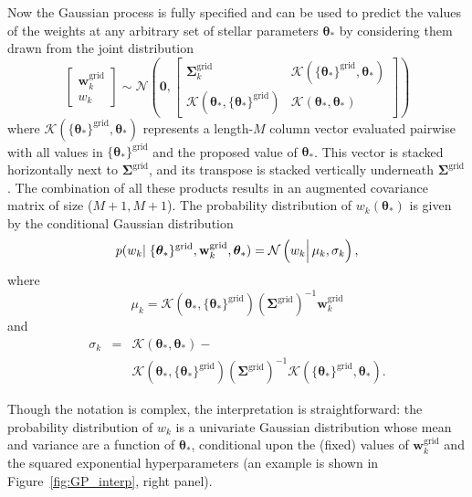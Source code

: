 \documentclass[iop,floatfix,numberedappendix,twocolappendix]{emulateapj}
\newcommand{\vt}{ {\bm \theta}}
\begin{document}
Now the Gaussian process is fully specified and can be used to predict the values of the weights at 
any arbitrary set of stellar parameters $\vt_\ast$ by considering them drawn from the joint 
distribution 
\begin{equation}
  \begin{bmatrix}
    \mathbf{w}_k^\textrm{grid}\\
    w_k
  \end{bmatrix} \sim
  \mathcal{N} \left (
  \mathbf{0},
  \begin{bmatrix}
  \mathbf{\Sigma}_k^\textrm{grid} & \mathcal{K}( \{\vt_\ast \}^\textrm{grid}, \vt_\ast) \\
  \mathcal{K}(\vt_\ast, \{\vt_\ast \}^\textrm{grid}) & \mathcal{K}(\vt_\ast,\vt_\ast)
  \end{bmatrix}
  \right )
\end{equation}
where $\mathcal{K}( \{\vt_\ast \}^\textrm{grid}, \vt_\ast)$ represents a length-$M$ column vector 
evaluated pairwise with all values in $\{\vt_\ast \}^\textrm{grid}$ and the proposed value of 
$\vt_\ast$.  This vector is stacked horizontally next to $\mathbf{\Sigma}^\textrm{grid}$, and its 
transpose is stacked vertically underneath $\mathbf{\Sigma}^\textrm{grid}$.  The combination of all 
these products results in an augmented covariance matrix of size ($M + 1, M + 1$).  The probability 
distribution of $w_k(\vt_\ast)$ is given by the conditional Gaussian distribution 
\citep{rasmussen05}
\begin{equation}
  p(w_k |\; \{\vt_\ast \}^\textrm{grid}, \mathbf{w}_k^\textrm{grid}, \vt_\ast) =  \mathcal{N} \left ( w_k \Bigl | \Bigr . \,  \mu_k , \sigma_k \right ),
 \label{eqn:conditional_gp}
\end{equation}
where
\begin{equation}
 \mu_k =   \mathcal{K}(\vt_\ast, \{\vt_\ast \}^\textrm{grid}) (\mathbf{\Sigma}^{\textrm{grid}})^{-1} \mathbf{w}_k^\textrm{grid}
\end{equation}
and 
\begin{eqnarray}
  \sigma_k &=& \mathcal{K}(\vt_\ast,\vt_\ast) - \\
  & & \mathcal{K}(\vt_\ast, \{\vt_\ast \}^\textrm{grid}) (\mathbf{\Sigma}^{\textrm{grid}})^{-1} \mathcal{K}( \{\vt_\ast \}^\textrm{grid}, \vt_\ast) \nonumber.
\end{eqnarray}

Though the notation is complex, the interpretation is straightforward: the probability distribution 
of $w_k$ is a univariate Gaussian distribution whose mean and variance are a function of 
$\vt_\ast$, conditional upon the (fixed) values of $\mathbf{w}_k^\textrm{grid}$ and the squared 
exponential hyperparameters (an example is shown in Figure~\ref{fig:GP_interp}, right panel).
\end{document}
